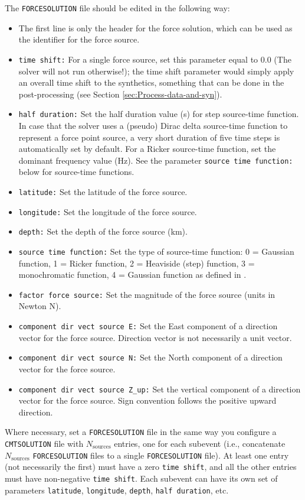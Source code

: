 \noindent The \texttt{FORCESOLUTION} file should be edited in the
following way:
\begin{itemize}
\item The first line is only the header for the force solution, which can
be used as the identifier for the force source.
\item \texttt{time shift:} For a single force source, set
this  parameter equal to $0.0$ (The solver will not run otherwise!); the time
shift parameter would simply apply an overall time shift to the synthetics,
something that can be done in the post-processing (see Section \ref{sec:Process-data-and-syn}).
\item \texttt{half duration:} Set the half duration value (s) for step source-time
function. In case that the solver uses a (pseudo) Dirac delta source-time function to represent
a force point source, a very short duration of five time steps is automatically set by default.
For a Ricker source-time function, set the dominant frequency value (Hz).
See the parameter \texttt{source time function:} below for source-time functions.
\item \texttt{latitude:} Set the latitude of the force source.
\item \texttt{longitude:} Set the longitude of the force source.
\item \texttt{depth:} Set the depth of the force source (km).
\item \texttt{source time function:} Set the type of source-time function: 0 = Gaussian function, 1 = Ricker function, 2 = Heaviside (step) function, 3 = monochromatic function, 4 = Gaussian function as defined in \citet{Meschede2011}.
\item \texttt{factor force source:} Set the magnitude of the force source (units in Newton N).
\item \texttt{component dir vect source E:} Set the East component of a direction vector for the force
source. Direction vector is not necessarily a unit vector.
\item \texttt{component dir vect source N:} Set the North component of a direction vector for the force
source.
\item \texttt{component dir vect source Z\_up:} Set the vertical component of a direction vector for the force
source. Sign convention follows the positive upward direction.
\end{itemize}
\noindent Where necessary, set a \texttt{FORCESOLUTION} file in the
same way you configure a \texttt{CMTSOLUTION} file with $N_{\mathrm{sources}}$
entries, one for each subevent (i.e., concatenate $N_{\mathrm{sources}}$
\texttt{FORCESOLUTION} files to a single \texttt{FORCESOLUTION} file).
At least one entry (not necessarily the first) must have a zero \texttt{time
shift}, and all the other entries must have non-negative \texttt{time shift}.
Each subevent can have its own set of parameters \texttt{latitude}, \texttt{longitude}, \texttt{depth},
\texttt{half duration}, etc. \newline


